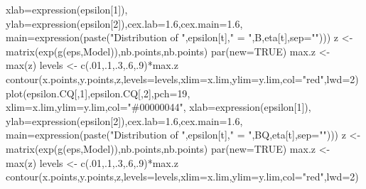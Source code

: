 \documentclass[
]{book}
\newenvironment{Shaded}{\begin{snugshade}}{\end{snugshade}}
\newcommand{\AttributeTok}[1]{\textcolor[rgb]{0.77,0.63,0.00}{#1}}
\newcommand{\ConstantTok}[1]{\textcolor[rgb]{0.00,0.00,0.00}{#1}}
\newcommand{\DecValTok}[1]{\textcolor[rgb]{0.00,0.00,0.81}{#1}}
\newcommand{\FloatTok}[1]{\textcolor[rgb]{0.00,0.00,0.81}{#1}}
\newcommand{\FunctionTok}[1]{\textcolor[rgb]{0.00,0.00,0.00}{#1}}
\newcommand{\NormalTok}[1]{#1}
\newcommand{\OtherTok}[1]{\textcolor[rgb]{0.56,0.35,0.01}{#1}}
\newcommand{\SpecialCharTok}[1]{\textcolor[rgb]{0.00,0.00,0.00}{#1}}
\newcommand{\StringTok}[1]{\textcolor[rgb]{0.31,0.60,0.02}{#1}}
\theoremstyle{definition}
\theoremstyle{definition}
\theoremstyle{definition}
\theoremstyle{definition}
\theoremstyle{remark}
\begin{document}
\begin{Shaded}
\begin{Highlighting}[]
     \AttributeTok{xlab=}\FunctionTok{expression}\NormalTok{(epsilon[}\DecValTok{1}\NormalTok{]),}
     \AttributeTok{ylab=}\FunctionTok{expression}\NormalTok{(epsilon[}\DecValTok{2}\NormalTok{]),}\AttributeTok{cex.lab=}\FloatTok{1.6}\NormalTok{,}\AttributeTok{cex.main=}\FloatTok{1.6}\NormalTok{,}
     \AttributeTok{main=}\FunctionTok{expression}\NormalTok{(}\FunctionTok{paste}\NormalTok{(}\StringTok{"Distribution of "}\NormalTok{,epsilon[t],}\StringTok{" = "}\NormalTok{,B,eta[t],}\AttributeTok{sep=}\StringTok{""}\NormalTok{)))}
\NormalTok{z }\OtherTok{\textless{}{-}} \FunctionTok{matrix}\NormalTok{(}\FunctionTok{exp}\NormalTok{(}\FunctionTok{g}\NormalTok{(eps,Model)),nb.points,nb.points)}
\FunctionTok{par}\NormalTok{(}\AttributeTok{new=}\ConstantTok{TRUE}\NormalTok{)}
\NormalTok{max.z }\OtherTok{\textless{}{-}} \FunctionTok{max}\NormalTok{(z)}
\NormalTok{levels }\OtherTok{\textless{}{-}} \FunctionTok{c}\NormalTok{(.}\DecValTok{01}\NormalTok{,.}\DecValTok{1}\NormalTok{,.}\DecValTok{3}\NormalTok{,.}\DecValTok{6}\NormalTok{,.}\DecValTok{9}\NormalTok{)}\SpecialCharTok{*}\NormalTok{max.z}
\FunctionTok{contour}\NormalTok{(x.points,y.points,z,}\AttributeTok{levels=}\NormalTok{levels,}\AttributeTok{xlim=}\NormalTok{x.lim,}\AttributeTok{ylim=}\NormalTok{y.lim,}\AttributeTok{col=}\StringTok{"red"}\NormalTok{,}\AttributeTok{lwd=}\DecValTok{2}\NormalTok{)}
\FunctionTok{plot}\NormalTok{(epsilon.CQ[,}\DecValTok{1}\NormalTok{],epsilon.CQ[,}\DecValTok{2}\NormalTok{],}\AttributeTok{pch=}\DecValTok{19}\NormalTok{,}
     \AttributeTok{xlim=}\NormalTok{x.lim,}\AttributeTok{ylim=}\NormalTok{y.lim,}\AttributeTok{col=}\StringTok{"\#00000044"}\NormalTok{,}
     \AttributeTok{xlab=}\FunctionTok{expression}\NormalTok{(epsilon[}\DecValTok{1}\NormalTok{]),}
     \AttributeTok{ylab=}\FunctionTok{expression}\NormalTok{(epsilon[}\DecValTok{2}\NormalTok{]),}\AttributeTok{cex.lab=}\FloatTok{1.6}\NormalTok{,}\AttributeTok{cex.main=}\FloatTok{1.6}\NormalTok{,}
     \AttributeTok{main=}\FunctionTok{expression}\NormalTok{(}\FunctionTok{paste}\NormalTok{(}\StringTok{"Distribution of "}\NormalTok{,epsilon[t],}\StringTok{" = "}\NormalTok{,BQ,eta[t],}\AttributeTok{sep=}\StringTok{""}\NormalTok{)))}
\NormalTok{z }\OtherTok{\textless{}{-}} \FunctionTok{matrix}\NormalTok{(}\FunctionTok{exp}\NormalTok{(}\FunctionTok{g}\NormalTok{(eps,Model)),nb.points,nb.points)}
\FunctionTok{par}\NormalTok{(}\AttributeTok{new=}\ConstantTok{TRUE}\NormalTok{)}
\NormalTok{max.z }\OtherTok{\textless{}{-}} \FunctionTok{max}\NormalTok{(z)}
\NormalTok{levels }\OtherTok{\textless{}{-}} \FunctionTok{c}\NormalTok{(.}\DecValTok{01}\NormalTok{,.}\DecValTok{1}\NormalTok{,.}\DecValTok{3}\NormalTok{,.}\DecValTok{6}\NormalTok{,.}\DecValTok{9}\NormalTok{)}\SpecialCharTok{*}\NormalTok{max.z}
\FunctionTok{contour}\NormalTok{(x.points,y.points,z,}\AttributeTok{levels=}\NormalTok{levels,}\AttributeTok{xlim=}\NormalTok{x.lim,}\AttributeTok{ylim=}\NormalTok{y.lim,}\AttributeTok{col=}\StringTok{"red"}\NormalTok{,}\AttributeTok{lwd=}\DecValTok{2}\NormalTok{)}
\end{Highlighting}
\end{Shaded}
\end{document}
